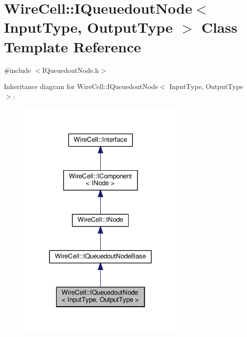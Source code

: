 \hypertarget{class_wire_cell_1_1_i_queuedout_node}{}\section{Wire\+Cell\+:\+:I\+Queuedout\+Node$<$ Input\+Type, Output\+Type $>$ Class Template Reference}
\label{class_wire_cell_1_1_i_queuedout_node}


{\ttfamily \#include $<$I\+Queuedout\+Node.\+h$>$}



Inheritance diagram for Wire\+Cell\+:\+:I\+Queuedout\+Node$<$ Input\+Type, Output\+Type $>$\+:
\nopagebreak
\begin{figure}[H]
\begin{center}
\leavevmode
\includegraphics[width=236pt]{class_wire_cell_1_1_i_queuedout_node__inherit__graph}
\end{center}
\end{figure}


